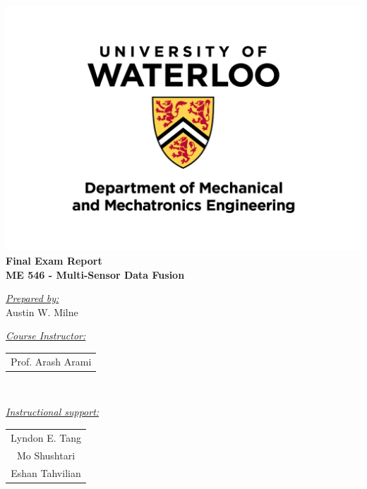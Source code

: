 \documentclass[12pt]{article}
\begin{document}
\fancyhead{} %
\renewcommand{\headrulewidth}{0pt} %

\fancyfoot{} %
{ %
    \centering
    \includegraphics[width=0.75\linewidth]{resources/uwaterloo_mechanical_and_mechatronics_engineering/UWaterloo_Mechanical_Mechatronics_Eng_Logo_vert_rgb.png}
    \sepline
    \centering
    \bf \LARGE
    Final Exam Report\\
    ME 546 - Multi-Sensor Data Fusion
    \sepline
}
\vspace{0.5cm}
{ %
    \centering
    \normalsize\underline{\emph{\quad Prepared by:\quad}}\\
    \vspace{0.5em}
    \large Austin W. Milne \\
    \vspace{1.5em}
    \begin{minipage}[t]{.49\textwidth}
        \centering
        \normalsize\underline{\emph{Course Instructor:}}\\
        \vspace{0.5em}
        \large
        \begin{tabular}{c}
            Prof. Arash Arami \\
        \end{tabular}\\
    \end{minipage}
    \begin{minipage}[t]{.49\textwidth}
        \centering
        \normalsize\underline{\emph{Instructional support:}}\\
        \vspace{0.5em}
        \large
        \begin{tabular}{c}
            Lyndon E. Tang \\
            Mo Shushtari \\
            Eshan Tahvilian \\
        \end{tabular}\\
    \end{minipage}
}
\end{document}
